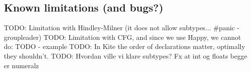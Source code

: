 
\subsection{Known limitations (and bugs?)}
TODO: Limitation with Hindley-Milner (it does not allow subtypes... \#panic - groupleader)
TODO: Limitation with CFG, and since we use Happy, we cannot do: TODO - example
TODO: In Kite the order of declarations matter, optimally they shouldn't.
TODO: Hvordan ville vi klare subtypes? Fx at int og floats begge er numeralz
